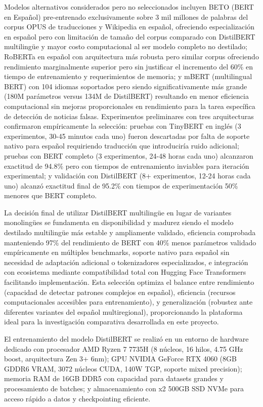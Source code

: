 Modelos alternativos considerados pero no seleccionados incluyen BETO (BERT en Español) pre-entrenado exclusivamente sobre 3 mil millones de palabras del corpus OPUS de traducciones y Wikipedia en español, ofreciendo especialización en español pero con limitación de tamaño del corpus comparado con DistilBERT multilingüe y mayor costo computacional al ser modelo completo no destilado; RoBERTa en español con arquitectura más robusta pero similar corpus ofreciendo rendimiento marginalmente superior pero sin justificar el incremento del 60\% en tiempo de entrenamiento y requerimientos de memoria; y mBERT (multilingual BERT) con 104 idiomas soportados pero siendo significativamente más grande (180M parámetros versus 134M de DistilBERT) resultando en menor eficiencia computacional sin mejoras proporcionales en rendimiento para la tarea específica de detección de noticias falsas. Experimentos preliminares con tres arquitecturas confirmaron empíricamente la selección: pruebas con TinyBERT en inglés (3 experimentos, 30-45 minutos cada uno) fueron descartadas por falta de soporte nativo para español requiriendo traducción que introduciría ruido adicional; pruebas con BERT completo (3 experimentos, 24-48 horas cada uno) alcanzaron exactitud de 94.8\% pero con tiempos de entrenamiento inviables para iteración experimental; y validación con DistilBERT (8+ experimentos, 12-24 horas cada uno) alcanzó exactitud final de 95.2\% con tiempos de experimentación 50\% menores que BERT completo.

La decisión final de utilizar DistilBERT multilingüe en lugar de variantes monolingües se fundamenta en disponibilidad y madurez siendo el modelo destilado multilingüe más estable y ampliamente validado, eficiencia comprobada manteniendo 97\% del rendimiento de BERT con 40\% menos parámetros validado empíricamente en múltiples benchmarks, soporte nativo para español sin necesidad de adaptación adicional o tokenizadores especializados, e integración con ecosistema mediante compatibilidad total con Hugging Face Transformers facilitando implementación. Esta selección optimiza el balance entre rendimiento (capacidad de detectar patrones complejos en español), eficiencia (recursos computacionales accesibles para entrenamiento), y generalización (robustez ante diferentes variantes del español multiregional), proporcionando la plataforma ideal para la investigación comparativa desarrollada en este proyecto.

El entrenamiento del modelo DistilBERT se realizó en un entorno de hardware dedicado con procesador AMD Ryzen 7 7735H (8 núcleos, 16 hilos, 4.75 GHz boost, arquitectura Zen 3+ 6nm); GPU NVIDIA GeForce RTX 4060 (8GB GDDR6 VRAM, 3072 núcleos CUDA, 140W TGP, soporte mixed precision); memoria RAM de 16GB DDR5 con capacidad para datasets grandes y procesamiento de batches; y almacenamiento con x2 500GB SSD NVMe para acceso rápido a datos y checkpointing eficiente.

